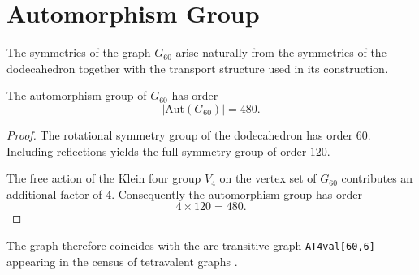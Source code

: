 \section{Automorphism Group}

The symmetries of the graph $G_{60}$ arise naturally from the
symmetries of the dodecahedron together with the transport structure
used in its construction.

\begin{proposition}
The automorphism group of $G_{60}$ has order
\[
|\mathrm{Aut}(G_{60})| = 480 .
\]
\end{proposition}

\begin{proof}
The rotational symmetry group of the dodecahedron has order $60$.
Including reflections yields the full symmetry group of order $120$.

The free action of the Klein four group $V_4$ on the vertex set of
$G_{60}$ contributes an additional factor of $4$.  Consequently the
automorphism group has order
\[
4 \times 120 = 480 .
\]
\end{proof}

The graph therefore coincides with the arc-transitive graph
\texttt{AT4val[60,6]} appearing in the census of tetravalent graphs
\cite{potocnik_census}.
